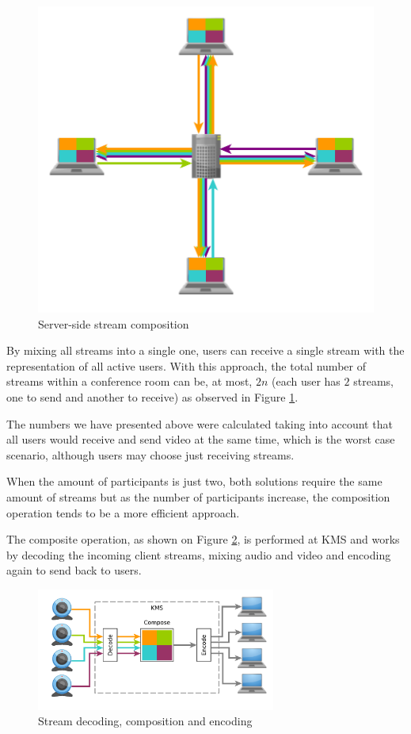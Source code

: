 \begin{figure}
\begin{minipage}[b]{0.45\linewidth}
	\includegraphics[width=\textwidth]{figures/ecomposite.pdf}
		\caption{Server-side stream composition}
	\label{fig:ecomposite}
\end{minipage}
\end{figure}


		By mixing all streams into a single one, users can receive a single stream with the representation of all active users. With this approach, the total number of streams within a conference room can be, at most, $2n$ (each user has $2$ streams, one to send and another to receive) as observed in Figure \ref{fig:ecomposite}.

		The numbers we have presented above were calculated taking into account that all users would receive and send video at the same time, which is the worst case scenario, although users may choose just receiving streams.

		When the amount of participants is just two, both solutions require the same amount of streams but as the number of participants increase, the composition operation tends to be a more efficient approach. 

		The composite operation, as shown on Figure \ref{fig:wcomposite}, is performed at \ac{KMS} and works by decoding the incoming client streams, mixing audio and video and encoding again to send back to users.

	\begin{figure}
		\centering
		\includegraphics[width=0.7\textwidth]{figures/wcomposite.pdf}
		\caption{Stream decoding, composition and encoding}
		\label{fig:wcomposite}
	\end{figure}



